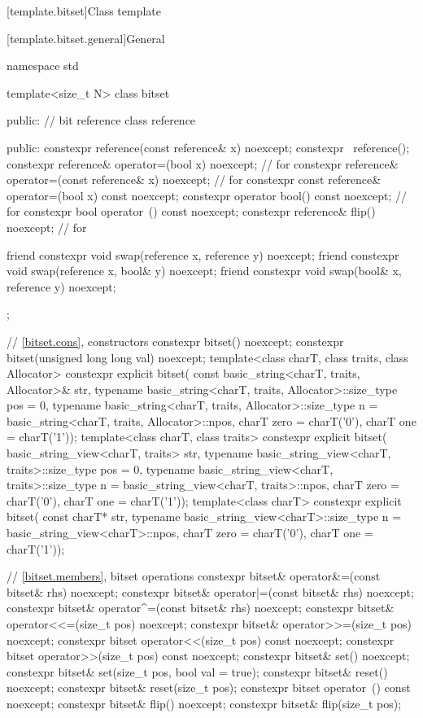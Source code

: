 [template.bitset]{Class template }%

[template.bitset.general]{General}%
%
\begin{codeblock}
namespace std {
  template<size_t N> class bitset {
  public:
    // bit reference
    class reference {
    public:
      constexpr reference(const reference& x) noexcept;
      constexpr ~reference();
      constexpr reference& operator=(bool x) noexcept;              // for 
      constexpr reference& operator=(const reference& x) noexcept;  // for 
      constexpr const reference& operator=(bool x) const noexcept;
      constexpr operator bool() const noexcept;                     // for 
      constexpr bool operator~() const noexcept;
      constexpr reference& flip() noexcept;                         // for 

      friend constexpr void swap(reference x, reference y) noexcept;
      friend constexpr void swap(reference x, bool& y) noexcept;
      friend constexpr void swap(bool& x, reference y) noexcept;
    };

    // \ref{bitset.cons}, constructors
    constexpr bitset() noexcept;
    constexpr bitset(unsigned long long val) noexcept;
    template<class charT, class traits, class Allocator>
      constexpr explicit bitset(
        const basic_string<charT, traits, Allocator>& str,
        typename basic_string<charT, traits, Allocator>::size_type pos = 0,
        typename basic_string<charT, traits, Allocator>::size_type n
          = basic_string<charT, traits, Allocator>::npos,
        charT zero = charT('0'),
        charT one = charT('1'));
    template<class charT, class traits>
      constexpr explicit bitset(
        basic_string_view<charT, traits> str,
        typename basic_string_view<charT, traits>::size_type pos = 0,
        typename basic_string_view<charT, traits>::size_type n
          = basic_string_view<charT, traits>::npos,
        charT zero = charT('0'),
        charT one = charT('1'));
    template<class charT>
      constexpr explicit bitset(
        const charT* str,
        typename basic_string_view<charT>::size_type n = basic_string_view<charT>::npos,
        charT zero = charT('0'),
        charT one = charT('1'));

    // \ref{bitset.members}, bitset operations
    constexpr bitset& operator&=(const bitset& rhs) noexcept;
    constexpr bitset& operator|=(const bitset& rhs) noexcept;
    constexpr bitset& operator^=(const bitset& rhs) noexcept;
    constexpr bitset& operator<<=(size_t pos) noexcept;
    constexpr bitset& operator>>=(size_t pos) noexcept;
    constexpr bitset  operator<<(size_t pos) const noexcept;
    constexpr bitset  operator>>(size_t pos) const noexcept;
    constexpr bitset& set() noexcept;
    constexpr bitset& set(size_t pos, bool val = true);
    constexpr bitset& reset() noexcept;
    constexpr bitset& reset(size_t pos);
    constexpr bitset  operator~() const noexcept;
    constexpr bitset& flip() noexcept;
    constexpr bitset& flip(size_t pos);

}}
\end{codeblock}
